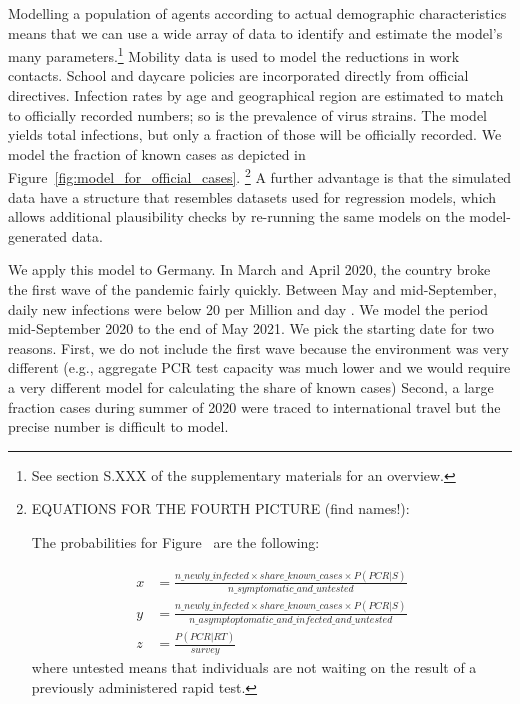 Modelling a population of agents according to actual demographic characteristics means
that we can use a wide array of data to identify and estimate the model's many
parameters.\footnote{See section S.XXX of the supplementary materials for an
    overview.} Mobility data is used to
model the reductions in work contacts. School and daycare policies are incorporated
directly from official directives. Infection rates by age and geographical region are
estimated to match to officially recorded numbers; so is the prevalence of virus
strains. The model yields total infections, but only a fraction of those will be
officially recorded. We model the fraction of known cases as depicted in
Figure~\ref{fig:model_for_official_cases}.
\footnote{EQUATIONS FOR THE FOURTH PICTURE (find names!):

    The probabilities for Figure~ are the
    following:

    \begin{align*}
        x & = \frac{n\_newly\_infected \times share\_known\_cases \times P(PCR | S)}{n\_symptomatic\_and\_untested}                    \\
        y & = \frac{n\_newly\_infected \times share\_known\_cases \times P(PCR | S)}{n\_asymptoptomatic\_and\_infected\_and\_untested} \\
        z & = \frac{P(PCR | RT)}{survey}
    \end{align*}
    where untested means that individuals are not waiting on the result of a previously
    administered rapid test.} A further advantage is that the simulated data have a
structure that resembles datasets used for regression models, which allows
additional plausibility checks by re-running the same models on the model-generated
data.

We apply this model to Germany. In March and April 2020, the country broke the first wave
of the pandemic fairly quickly. Between May and mid-September, daily new infections
were below 20 per Million and day \citep{MaxRoser2020}. We model the
period mid-September 2020 to the end of May 2021. We pick the starting date for two
reasons. First, we do not include the first wave because the environment was very
different (e.g., aggregate PCR test capacity was much lower and we would require a very
different model for calculating the share of known cases) Second, a large fraction cases
during summer of 2020 were traced to international travel
\citep{KochInstitut2021,Hodcroft2021} but the precise number is difficult to model.

